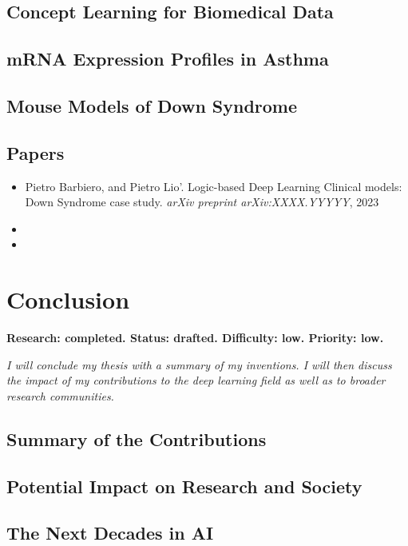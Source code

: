 \documentclass[withindex,glossary]{cam-thesis}
\begin{document}
\section{Concept Learning for Biomedical Data}

\section{mRNA Expression Profiles in Asthma}

\section{Mouse Models of Down Syndrome}


\section*{Papers}
\nobibliography*
\begin{itemize}
    \item Pietro Barbiero, and Pietro Lio'. Logic-based Deep Learning Clinical models: Down Syndrome case study. \textit{arXiv preprint arXiv:XXXX.YYYYY}, 2023
    \item {}
    \item {}
\end{itemize}


\chapter{Conclusion} \label{chapter:conclusion}
\textbf{Research: completed. Status: drafted. Difficulty: low. Priority: low.}

\textit{I will conclude my thesis with a summary of my inventions. I will then discuss the impact of my contributions to the deep learning field as well as to broader research communities.}

\section{Summary of the Contributions}

\section{Potential Impact on Research and Society}

\section{The Next Decades in AI}
\end{document}

